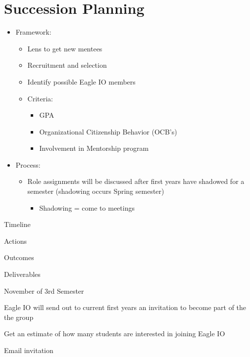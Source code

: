 \documentclass[
]{book}
\providecommand{\tightlist}{%
  \setlength{\itemsep}{0pt}\setlength{\parskip}{0pt}}
\begin{document}
\hypertarget{succession-planning}{%
\chapter{Succession Planning}\label{succession-planning}}

\begin{itemize}
\tightlist
\item
  Framework:

  \begin{itemize}
  \tightlist
  \item
    Lens to get new mentees
  \item
    Recruitment and selection
  \item
    Identify possible Eagle IO members
  \item
    Criteria:

    \begin{itemize}
    \tightlist
    \item
      GPA
    \item
      Organizational Citizenship Behavior (OCB's)
    \item
      Involvement in Mentorship program
    \end{itemize}
  \end{itemize}
\item
  Process:

  \begin{itemize}
  \tightlist
  \item
    Role assignments will be discussed after first years have shadowed for a semester (shadowing occurs Spring semester)

    \begin{itemize}
    \tightlist
    \item
      Shadowing = come to meetings
    \end{itemize}
  \end{itemize}
\end{itemize}

Timeline

Actions

Outcomes

Deliverables

November of 3rd Semester

Eagle IO will send out to current first years an invitation to become part of the the group

Get an estimate of how many students are interested in joining Eagle IO

Email invitation
\end{document}
